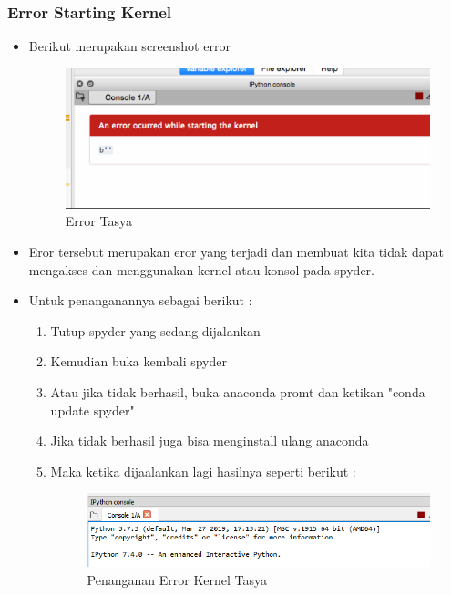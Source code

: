 \subsubsection{Error Starting Kernel}
\begin{itemize}
\item Berikut merupakan screenshot error
\begin{figure}[ht]
\centering
\includegraphics[scale=0.5]{figures/Chapter 7/1164086/Praktek/chapter7eror1.png}
\caption{Error Tasya}
\label{Error}
\end{figure}

\item Eror tersebut merupakan eror yang terjadi dan membuat kita tidak dapat mengakses dan menggunakan kernel atau konsol pada spyder.

\item Untuk penanganannya sebagai berikut :\\
\begin{enumerate}
\item Tutup spyder yang sedang dijalankan
\item Kemudian buka kembali spyder
\item Atau jika tidak berhasil, buka anaconda promt dan ketikan "conda update spyder"
\item Jika tidak berhasil juga bisa menginstall ulang anaconda
\item Maka ketika dijaalankan lagi hasilnya seperti berikut :\\
\begin{figure}[ht]
\centering
\includegraphics[scale=0.5]{figures/Chapter 7/1164086/Praktek/chapter7eror2.png}
\caption{Penanganan Error Kernel Tasya}
\label{Error}
\end{figure}
\end{enumerate}
\end{itemize}
